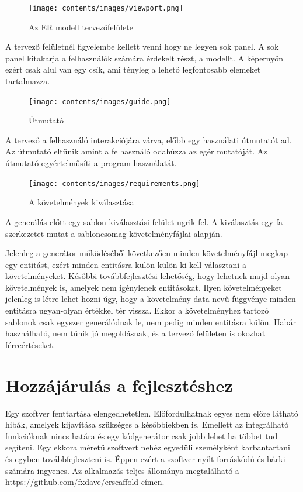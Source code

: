 \documentclass[a4paper,12pt,oneside]{report}
\begin{document}
\begin{justify}
	\begin{figure}[H]
		\texttt{[image: contents/images/viewport.png]}
		\caption{Az ER modell tervezőfelülete}
		\label{fig:viewport}
	\end{figure}

	A tervező felületnél figyelembe kellett venni hogy ne legyen sok panel. A sok panel kitakarja a felhasználók számára érdekelt részt, a modellt. A képernyőn ezért csak alul van egy csík, ami tényleg a lehető legfontosabb elemeket tartalmazza.


	\begin{figure}[H]
		\texttt{[image: contents/images/guide.png]}
		\caption{Útmutató}
		\label{fig:guide}
	\end{figure}

	A tervező a felhasználó interakciójára várva, előbb egy használati útmutatót ad. Az útmutató eltűnik amint a felhasználó odahúzza az egér mutatóját. Az útmutató egyértelműsíti a program használatát. 
\end{justify}

\newpage

\begin{figure}[H]
	\texttt{[image: contents/images/requirements.png]}
	\caption{A követelmények kiválasztása}
	\label{fig:requirements}
\end{figure}

\begin{justify}
	A generálás előtt egy sablon kiválasztási felület ugrik fel. A kiválasztás egy fa szerkezetet mutat a sabloncsomag követelményfájlai alapján.

	Jelenleg a generátor működéséből következően minden követelményfájl megkap egy entitást, ezért minden entitásra külön-külön ki kell választani a követelményeket. Későbbi továbbfejlesztési lehetőség, hogy lehetnek majd olyan követelmények is, amelyek nem igénylenek entitásokat. Ilyen követelményeket jelenleg is létre lehet hozni úgy, hogy a követelmény data nevű függvénye minden entitásra ugyan-olyan értékkel tér vissza. Ekkor a követelményhez tartozó sablonok csak egyszer generálódnak le, nem pedig minden entitásra külön. Habár használható, nem tűnik jó megoldásnak, és a tervező felületen is okozhat férreértéseket.

\end{justify}

\clearpage
\section{Hozzájárulás a fejlesztéshez}
\begin{justify}
	Egy szoftver fenttartása elengedhetetlen. Előfordulhatnak egyes nem előre látható hibák, amelyek kijavítása szükséges a későbbiekben is. Emellett az integrálható funkcióknak nincs határa és egy kódgenerátor csak jobb lehet ha többet tud segíteni. Egy ekkora méretű szoftvert nehéz egyedüli személyként karbantartani és egyben továbbfejleszteni is. Éppen ezért a szoftver nyílt forráskódú és bárki számára ingyenes. Az alkalmazás teljes állománya megtalálható a https://github.com/fxdave/erscaffold címen.
\end{justify}
\end{document}
